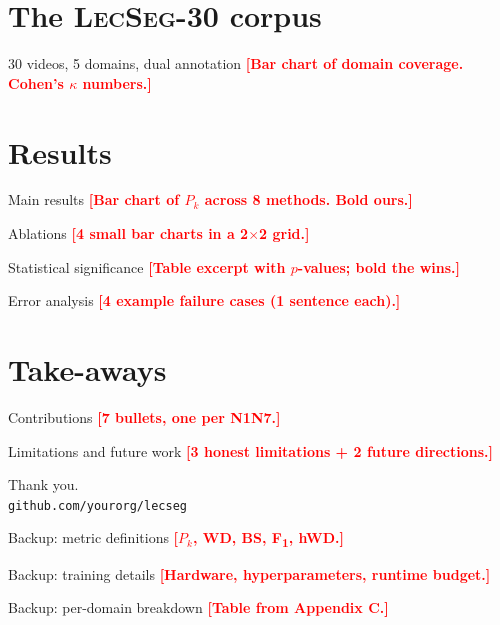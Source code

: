\documentclass[aspectratio=169]{beamer}
\newcommand{\dataset}{\textsc{LecSeg-30}}
\newcommand{\todo}[1]{\textcolor{red}{\textbf{[#1]}}}
\begin{document}
\section{The \dataset{} corpus}
\begin{frame}{30 videos, 5 domains, dual annotation}
  \todo{Bar chart of domain coverage. Cohen's $\kappa$ numbers.}
\end{frame}

\section{Results}
\begin{frame}{Main results}
  \todo{Bar chart of $P_k$ across 8 methods. Bold ours.}
\end{frame}

\begin{frame}{Ablations}
  \todo{4 small bar charts in a 2$\times$2 grid.}
\end{frame}

\begin{frame}{Statistical significance}
  \todo{Table excerpt with $p$-values; bold the wins.}
\end{frame}

\begin{frame}{Error analysis}
  \todo{4 example failure cases (1 sentence each).}
\end{frame}

\section{Take-aways}
\begin{frame}{Contributions}
  \todo{7 bullets, one per N1\textendash N7.}
\end{frame}

\begin{frame}{Limitations and future work}
  \todo{3 honest limitations + 2 future directions.}
\end{frame}

\begin{frame}[standout]
  Thank you.\\
  \vspace{1em}
  \texttt{github.com/yourorg/lecseg}
\end{frame}

\appendix
\begin{frame}{Backup: metric definitions}
  \todo{$P_k$, WD, BS, F\textsubscript{1}, hWD.}
\end{frame}

\begin{frame}{Backup: training details}
  \todo{Hardware, hyperparameters, runtime budget.}
\end{frame}

\begin{frame}{Backup: per-domain breakdown}
  \todo{Table from Appendix C.}
\end{frame}
\end{document}
